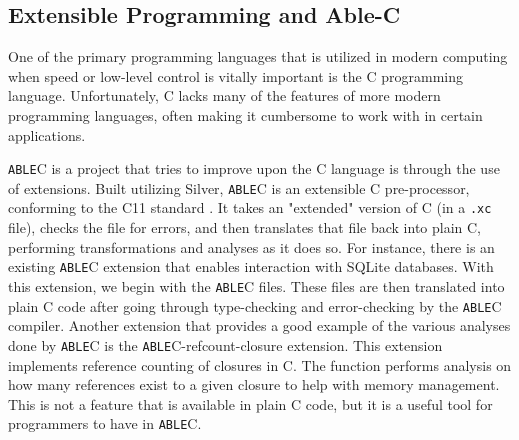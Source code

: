 \documentclass[main.tex]{subfiles}
\begin{document}
\subsection{Extensible Programming and Able-C} %
One of the primary programming languages that is utilized in modern computing
when speed or low-level control is vitally important is the C programming
language. Unfortunately, C lacks many of the features of more modern programming
languages, often making it cumbersome to work with in certain applications.

\verb|ABLE|C \cite{9} is a project that tries to improve upon the C language is through the use
of extensions. Built utilizing Silver, \verb|ABLE|C is an 
extensible C pre-processor, conforming to the C11 standard \cite{9}. It takes an
"extended" version of C (in a \verb|.xc| file), checks the file for errors, and then translates that
file back into plain C, performing
transformations and analyses as it does so. For instance, there is an existing %
\verb|ABLE|C extension that enables interaction with SQLite databases. With this
extension, we begin with the \verb|ABLE|C files. These files are then translated
into plain C code after going through type-checking and error-checking by the
\verb|ABLE|C compiler. %
Another extension that provides a good example of the various analyses done by
\verb|ABLE|C is the \verb|ABLE|C-refcount-closure extension. This extension
implements reference counting of closures in C. The function performs analysis
on how many references exist to a given closure to help with memory management.
This is not a feature that is available in plain C code, but it is a useful tool for
programmers to have in \verb|ABLE|C.
\end{document}
